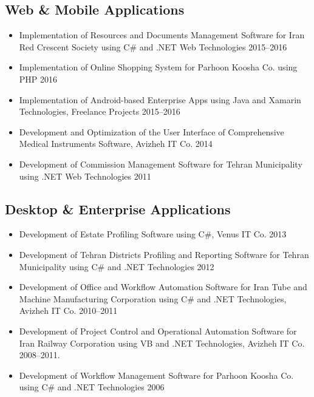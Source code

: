 \documentclass{cv}
\begin{document}
\subsection{Web \& Mobile Applications}

\begin{itemize}

\item
Implementation of Resources and Documents Management Software for Iran Red Crescent Society using C\# and .NET Web Technologies \hfill 2015--2016
\item
Implementation of Online Shopping System for Parhoon Koosha Co. using PHP \hfill 2016
\item
Implementation of Android-based Enterprise Apps using Java and Xamarin Technologies, Freelance Projects \hfill 2015--2016
\item
Development and Optimization of the User Interface of Comprehensive Medical Instruments Software, Avizheh IT Co. \hfill 2014
\item
Development of Commission Management Software for Tehran Municipality using .NET Web Technologies \hfill 2011

\end{itemize}


\subsection{Desktop \& Enterprise Applications}

\begin{itemize}

\item
Development of Estate Profiling Software using C\#, Venus IT Co. \hfill 2013
\item
Development of Tehran Districts Profiling and Reporting Software for Tehran Municipality using C\# and .NET Technologies \hfill 2012
\item
Development of Office and Workflow Automation Software for Iran Tube and Machine Manufacturing Corporation using C\# and .NET Technologies, Avizheh IT Co. \hfill 2010--2011
\item
Development of Project Control and Operational Automation Software for Iran Railway Corporation using VB and .NET Technologies, Avizheh IT Co. \hfill 2008--2011.
\item
Development of Workflow Management Software for Parhoon Koosha Co. using C\# and .NET Technologies \hfill 2006

\end{itemize}
\end{document}
